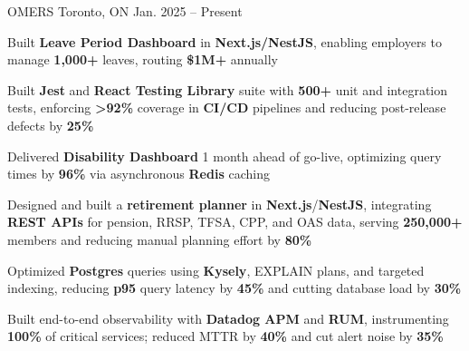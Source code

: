 \documentclass[11pt, a4paper]{awesome-cv}
\begin{document}
\makecvheader[C]


\begin{cventries}


  \cventry
    {\color{lightblue}{ASSOCIATE FULL-STACK ENGINEER}}
    {OMERS}
    {Toronto, ON}
    {Jan. 2025 -- Present}
    {
      \begin{cvitems}
        \item{Built \textbf{Leave Period Dashboard} in \textbf{Next.js/NestJS}, enabling employers to manage \textbf{1,000+} leaves, routing \textbf{\$1M+} annually}
        \item{Built \textbf{Jest} and \textbf{React Testing Library} suite with \textbf{500+} unit and integration tests, enforcing \textbf{>92\%} coverage in \textbf{CI/CD} pipelines and reducing post-release defects by \textbf{25\%}}
        \item{Delivered \textbf{Disability Dashboard} 1 month ahead of go-live, optimizing query times by \textbf{96\%} via asynchronous \textbf{Redis} caching}
        \item{Designed and built a \textbf{retirement planner} in \textbf{Next.js}/\textbf{NestJS}, integrating \textbf{REST APIs} for pension, RRSP, TFSA, CPP, and OAS data, serving \textbf{250,000+} members and reducing manual planning effort by \textbf{80\%}}
        \item{Optimized \textbf{Postgres} queries using \textbf{Kysely}, EXPLAIN plans, and targeted indexing, reducing \textbf{p95} query latency by \textbf{45\%} and cutting database load by \textbf{30\%}}
        \item{Built end-to-end observability with \textbf{Datadog APM} and \textbf{RUM}, instrumenting \textbf{100\%} of critical services; reduced MTTR by \textbf{40\%} and cut alert noise by \textbf{35\%}}
      \end{cvitems}
    }

  \vspace{3mm}


\end{cventries}
\end{document}
